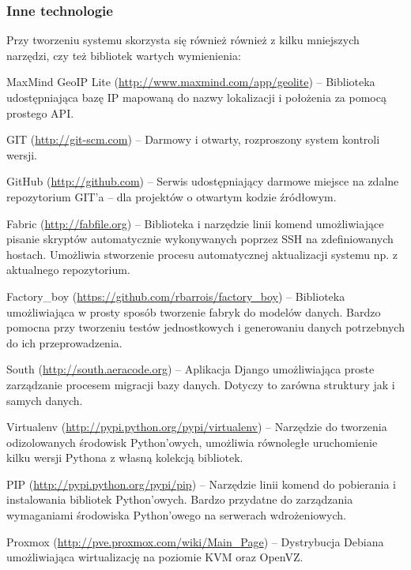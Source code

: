 \begin{minipage}{\textwidth}
    \subsubsection{Inne technologie}
    Przy tworzeniu systemu skorzysta się również również z kilku mniejszych narzędzi, czy też bibliotek wartych wymienienia:
    \begin{packed_item}
        \item{MaxMind GeoIP Lite (\url{http://www.maxmind.com/app/geolite}) -- Biblioteka udostępniająca bazę IP mapowaną do nazwy lokalizacji i położenia za pomocą prostego API.}
        \item{GIT (\url{http://git-scm.com}) -- Darmowy i otwarty, rozproszony system kontroli wersji.}
        \item{GitHub (\url{http://github.com}) -- Serwis udostępniający darmowe miejsce na zdalne repozytorium GIT'a -- dla projektów o otwartym kodzie źródłowym.}
        \item{Fabric (\url{http://fabfile.org}) -- Biblioteka i narzędzie linii komend umożliwiające pisanie skryptów automatycznie wykonywanych poprzez SSH na zdefiniowanych hostach. Umożliwia stworzenie procesu automatycznej aktualizacji systemu np. z aktualnego repozytorium.}
        \item{Factory\_boy (\url{https://github.com/rbarrois/factory\_boy}) -- Biblioteka umożliwiająca w prosty sposób tworzenie fabryk do modelów danych. Bardzo pomocna przy tworzeniu testów jednostkowych i generowaniu danych potrzebnych do ich przeprowadzenia.}
        \item{South (\url{http://south.aeracode.org}) -- Aplikacja Django umożliwiająca proste zarządzanie procesem migracji bazy danych. Dotyczy to zarówna struktury jak i samych danych.}
        \item{Virtualenv (\url{http://pypi.python.org/pypi/virtualenv}) -- Narzędzie do tworzenia odizolowanych środowisk Python'owych, umożliwia równoległe uruchomienie kilku wersji Pythona z własną kolekcją bibliotek.}
        \item{PIP (\url{http://pypi.python.org/pypi/pip}) -- Narzędzie linii komend do pobierania i instalowania bibliotek Python'owych. Bardzo przydatne do zarządzania wymaganiami środowiska Python'owego na serwerach wdrożeniowych.}
        \item{Proxmox (\url{http://pve.proxmox.com/wiki/Main_Page}) -- Dystrybucja Debiana umożliwiająca wirtualizację na poziomie KVM oraz OpenVZ.}

\end{packed_item}
\end{minipage}
